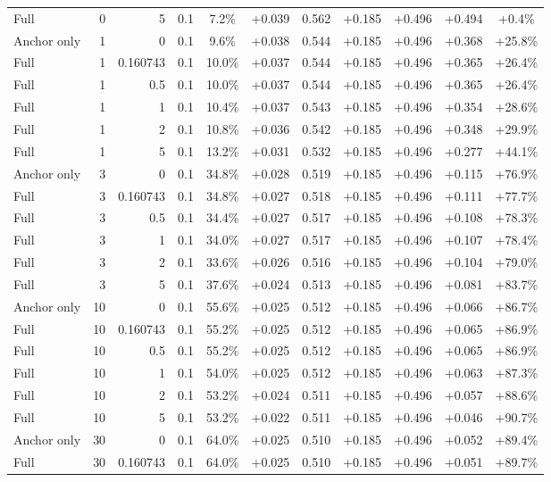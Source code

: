 \begin{table}[htbp]
\begin{tabular}{lrrrccccccc}
Full & 0 & 5 & 0.1 & 7.2\% & +0.039 & 0.562 & +0.185 & +0.496 & +0.494 & +0.4\% \\
Anchor only & 1 & 0 & 0.1 & 9.6\% & +0.038 & 0.544 & +0.185 & +0.496 & +0.368 & +25.8\% \\
Full & 1 & 0.160743 & 0.1 & 10.0\% & +0.037 & 0.544 & +0.185 & +0.496 & +0.365 & +26.4\% \\
Full & 1 & 0.5 & 0.1 & 10.0\% & +0.037 & 0.544 & +0.185 & +0.496 & +0.365 & +26.4\% \\
Full & 1 & 1 & 0.1 & 10.4\% & +0.037 & 0.543 & +0.185 & +0.496 & +0.354 & +28.6\% \\
Full & 1 & 2 & 0.1 & 10.8\% & +0.036 & 0.542 & +0.185 & +0.496 & +0.348 & +29.9\% \\
Full & 1 & 5 & 0.1 & 13.2\% & +0.031 & 0.532 & +0.185 & +0.496 & +0.277 & +44.1\% \\
Anchor only & 3 & 0 & 0.1 & 34.8\% & +0.028 & 0.519 & +0.185 & +0.496 & +0.115 & +76.9\% \\
Full & 3 & 0.160743 & 0.1 & 34.8\% & +0.027 & 0.518 & +0.185 & +0.496 & +0.111 & +77.7\% \\
Full & 3 & 0.5 & 0.1 & 34.4\% & +0.027 & 0.517 & +0.185 & +0.496 & +0.108 & +78.3\% \\
Full & 3 & 1 & 0.1 & 34.0\% & +0.027 & 0.517 & +0.185 & +0.496 & +0.107 & +78.4\% \\
Full & 3 & 2 & 0.1 & 33.6\% & +0.026 & 0.516 & +0.185 & +0.496 & +0.104 & +79.0\% \\
Full & 3 & 5 & 0.1 & 37.6\% & +0.024 & 0.513 & +0.185 & +0.496 & +0.081 & +83.7\% \\
Anchor only & 10 & 0 & 0.1 & 55.6\% & +0.025 & 0.512 & +0.185 & +0.496 & +0.066 & +86.7\% \\
Full & 10 & 0.160743 & 0.1 & 55.2\% & +0.025 & 0.512 & +0.185 & +0.496 & +0.065 & +86.9\% \\
Full & 10 & 0.5 & 0.1 & 55.2\% & +0.025 & 0.512 & +0.185 & +0.496 & +0.065 & +86.9\% \\
Full & 10 & 1 & 0.1 & 54.0\% & +0.025 & 0.512 & +0.185 & +0.496 & +0.063 & +87.3\% \\
Full & 10 & 2 & 0.1 & 53.2\% & +0.024 & 0.511 & +0.185 & +0.496 & +0.057 & +88.6\% \\
Full & 10 & 5 & 0.1 & 53.2\% & +0.022 & 0.511 & +0.185 & +0.496 & +0.046 & +90.7\% \\
Anchor only & 30 & 0 & 0.1 & 64.0\% & +0.025 & 0.510 & +0.185 & +0.496 & +0.052 & +89.4\% \\
Full & 30 & 0.160743 & 0.1 & 64.0\% & +0.025 & 0.510 & +0.185 & +0.496 & +0.051 & +89.7\% \\

\end{tabular}
\end{table}
